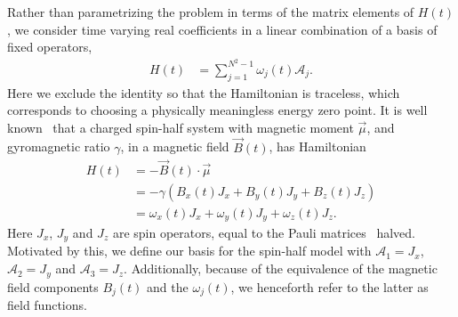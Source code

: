 \documentclass{jors}
\newcommand{\supervisordisagreement}[2]{\textcolor{green}{\texttt{{Supervisor disagreement!!! <<<<<<< Lincoln}}} \textcolor{blue}{#1} \textcolor{green}{\texttt{=======}} \textcolor{red}{#2} \textcolor{green}{\texttt{>>>>>>> James}}}
\begin{document}
		Rather than parametrizing the problem in terms of the matrix elements of $ H(t) $, we consider time varying real coefficients in a linear combination of a basis of fixed operators,
		\begin{align}
			H(t) &= \sum_{j = 1}^{N^2 - 1} \omega_j(t) \mathcal{A}_j.
		\end{align}
		Here we exclude the identity so that the Hamiltonian is traceless, which corresponds to choosing a physically meaningless energy zero point.
		It is well known~\cite[(p74)]{j_j_sakurai_jun_john_modern_2011} that a charged spin-half system with magnetic moment $ \overrightarrow{\mu} $, and gyromagnetic ratio $ \gamma $, in a magnetic field $ \overrightarrow{B}(t) $, has Hamiltonian
		\begin{align}
			H(t) &= -\overrightarrow{B}(t)\cdot \overrightarrow{\mu}\\
			&= -\gamma \left(B_x(t) J_x + B_y(t) J_y + B_z(t) J_z\right)\\
			&= \omega_x(t) J_x + \omega_y(t) J_y + \omega_z(t) J_z.
		\end{align}
		Here $ J_x $, $ J_y $ and $ J_z $ are spin operators, equal to the Pauli matrices~\cite[(p169)]{j_j_sakurai_jun_john_modern_2011} halved.
		Motivated by this, we define our basis for the spin-half model with $ \mathcal{A}_1 = J_x $, $ \mathcal{A}_2 = J_y $ and $ \mathcal{A}_3 = J_z $.
		Additionally, because of the equivalence of the magnetic field components $ B_j(t) $ and the $ \omega_j(t) $, we henceforth refer to the latter as field functions.
\end{document}
